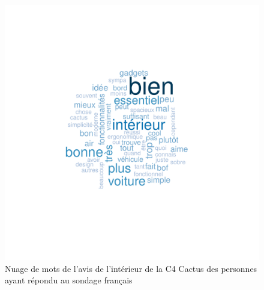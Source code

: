 \documentclass[12pt]{article}\usepackage[]{graphicx}\usepackage[]{color}
\makeatletter
\def\maxwidth{ %
  \ifdim\Gin@nat@width>\linewidth
    \linewidth
  \else
    \Gin@nat@width
  \fi
}
\newenvironment{knitrout}{}{} %
\makeatother
\begin{document}
\begin{knitrout}
\color{fgcolor}\begin{figure}[H]
\includegraphics[width=\maxwidth]{figure/interior_fr-1} \caption[Nuage de mots de l'avis de l'intérieur de la C4 Cactus des personnes ayant répondu au sondage français]{Nuage de mots de l'avis de l'intérieur de la C4 Cactus des personnes ayant répondu au sondage français}\label{fig:interior fr}
\end{figure}


\end{knitrout}
\end{document}
